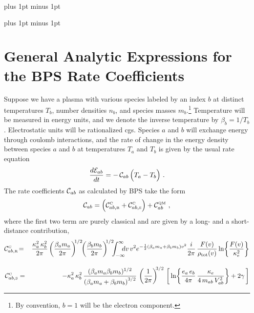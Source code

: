 \documentclass[preprint,12pt,eqsecnum,nofootinbib,amsmath,amssymb]{revtex4}
\newcommand{\smC}{{\rm\scriptscriptstyle C}}
\newcommand{\smR}{{\rm\scriptscriptstyle R}}
\newcommand{\smS}{{\rm\scriptscriptstyle S}}
\newcommand{\smQM}{{\rm\scriptscriptstyle QM}}
\newcommand{\bodyskip}{\baselineskip 18pt plus 1pt minus 1pt}
\newcommand{\tableofcontentsskip}{\baselineskip 14pt plus 1pt minus 1pt}
\begin{document}

\pagebreak
\tableofcontentsskip
\tableofcontents

\newpage
\bodyskip

\pagebreak
\clearpage

\newpage
\section{General Analytic Expressions for the BPS Rate Coefficients}
\label{sec:rate}

Suppose we have a plasma with various species labeled by an index $b$
at distinct temperatures $T_b$, number densities $n_b$, and species
masses $m_b$.\footnote{By convention, $b=1$ will be the electron
component.}  Temperature will be measured in energy units, and we
denote the inverse temperature by $\beta_b =1/T_b$. Electrostatic
units will be rationalized cgs.  Species $a$ and $b$ will exchange
energy through coulomb interactions, and the rate of change in the
energy density between species $a$ and $b$ at temperatures $T_a$ and
$T_b$ is given by the usual rate equation
\begin{eqnarray}
  \frac{d{\cal E}_{ab}}{dt}
  =
  -\, {\cal C}_{ab} \,\Big(T_a - T_b \Big)  \ .
\label{eq:Cab}
\end{eqnarray}
The rate coefficients ${\cal C}_{ab}$ as calculated by BPS take the
form 
\begin{eqnarray}
  {\cal C}_{ab}
  =
  \Big({\cal C}^\smC_{ab,\smR} 
  +
  {\cal C}^\smC_{ab,\smS} 
  \Big)
  +
  {\cal C}^\smQM_{ab} \ ,
\end{eqnarray}
where the first two term are purely classical and are given by a
long- and a short-distance contribution, 
\begin{eqnarray}
  {\cal C}^\smC_{ab,\smR} 
  &\!=\!&
  \frac{\kappa_a^2\, \kappa_b^2}{2\pi}
  \left(\frac{\beta_a m_a}{2\pi} \right)^{\!\! 1/2} \!\!
  \left(\frac{\beta_b m_b}{2\pi} \right)^{\!\! 1/2} \!\!\!
  \int_{-\infty}^{\infty} \!\!\!\! dv \, v^2 
  e^{- \frac{1}{2}( \beta_a m_a + \beta_b m_b) v^2 }  
  \frac{i}{2 \pi} \,\frac{F(v)}{\rho_\text{tot}(v)}
  \ln\! \left\{ \frac{F(v)}{\kappa_e^2}\right\} 
\label{CabA}
\\[10pt]
  {\cal C}^\smC_{ab,\smS} 
  &=& 
  \!-{\kappa_a^2\, \kappa_b^2 } \,
  \frac{ (\beta_a m_a \beta_b m_b)^{1/2}}{\left( \beta_a m_a + 
  \beta_b m_b \right)^{3/2} } \,\left( \frac{1}{2\pi} \right)^{\!\!3/2}\, 
  \left[\,\ln\!\left\{ \frac{e_a\,e_b}{4 \pi}\,
  \frac{\kappa_e}{4 \, m_{ab} \, V^2_{ab}}\right\} 
  + 2 \gamma\,  \right]  
\label{CabB}
\end{eqnarray}
\end{document}
